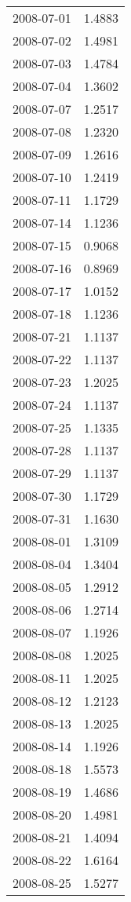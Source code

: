 \begin{tabular}{lr}
2008-07-01 &      1.4883 \\
2008-07-02 &      1.4981 \\
2008-07-03 &      1.4784 \\
2008-07-04 &      1.3602 \\
2008-07-07 &      1.2517 \\
2008-07-08 &      1.2320 \\
2008-07-09 &      1.2616 \\
2008-07-10 &      1.2419 \\
2008-07-11 &      1.1729 \\
2008-07-14 &      1.1236 \\
2008-07-15 &      0.9068 \\
2008-07-16 &      0.8969 \\
2008-07-17 &      1.0152 \\
2008-07-18 &      1.1236 \\
2008-07-21 &      1.1137 \\
2008-07-22 &      1.1137 \\
2008-07-23 &      1.2025 \\
2008-07-24 &      1.1137 \\
2008-07-25 &      1.1335 \\
2008-07-28 &      1.1137 \\
2008-07-29 &      1.1137 \\
2008-07-30 &      1.1729 \\
2008-07-31 &      1.1630 \\
2008-08-01 &      1.3109 \\
2008-08-04 &      1.3404 \\
2008-08-05 &      1.2912 \\
2008-08-06 &      1.2714 \\
2008-08-07 &      1.1926 \\
2008-08-08 &      1.2025 \\
2008-08-11 &      1.2025 \\
2008-08-12 &      1.2123 \\
2008-08-13 &      1.2025 \\
2008-08-14 &      1.1926 \\
2008-08-18 &      1.5573 \\
2008-08-19 &      1.4686 \\
2008-08-20 &      1.4981 \\
2008-08-21 &      1.4094 \\
2008-08-22 &      1.6164 \\
2008-08-25 &      1.5277 \\

\end{tabular}
